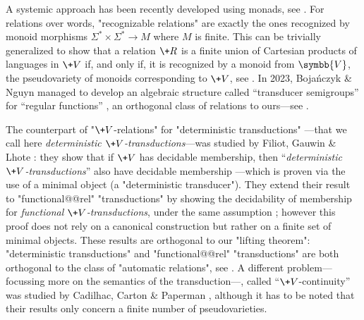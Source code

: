 A systemic approach has been recently developed using monads, see .
For relations over words, "recognizable 
relations" are exactly the ones recognized by monoid morphisms $\Sigma^* \times \Sigma^* \to M$ 
where $M$ is finite. This can be trivially generalized to show 
that a relation $\+R$ is a finite union of Cartesian products of languages in $\+V$ if, and only 
if, it is recognized by a monoid from $\symbb{V}$, the pseudovariety of monoids corresponding to
$\+V$, see .
In 2023, Bojańczyk \& Nguyn 
managed to develop an algebraic structure called ``transducer semigroups'' for ``regular functions'' \cite[Theorem 3.2, p.~6]{Bojanczyk2023Algebraic}, an 
orthogonal class of relations to ours---see .

The counterpart of "$\+V$-relations" for "deterministic transductions"
---that we call here \emph{deterministic $\+V$-transductions}---was studied by Filiot, Gauwin \& Lhote \cite{Filiot2019Logical}: they show that if
$\+V$ has decidable membership, then ``\emph{deterministic $\+V$-transductions}''
also have decidable membership \cite[Theorem 2.1]{Filiot2019Logical}---which is
proven via the use of a minimal object (a "deterministic transducer").
They extend their result to "functional@@rel" "transductions"
by showing the decidability of membership for \emph{functional $\+V$-transductions},
under the same assumption \cite[Theorem 4.10, p.~26]{Filiot2019Logical};
however this proof does not rely on a canonical construction but rather
on a finite set of minimal objects.
These results are orthogonal to our "lifting theorem": 
"deterministic transductions" and "functional@@rel" "transductions"
are both orthogonal to the class of "automatic relations", see
.
A different problem---focussing more on the semantics of the transduction---, called ``$\+V$-continuity'' was studied by Cadilhac, Carton \& Paperman \cite[Theorem 1.3, p.~3]{Cadilhac2020Continuity}, although it has to be noted that their results only concern
a finite number of pseudovarieties.